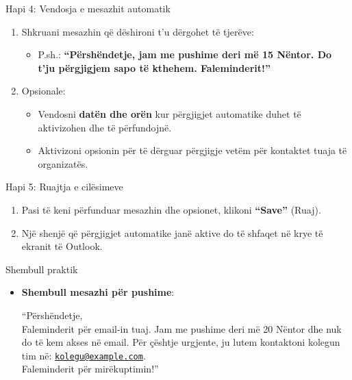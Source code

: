 \documentclass[
  ignorenonframetext,
]{beamer}
\providecommand{\tightlist}{%
  \setlength{\itemsep}{0pt}\setlength{\parskip}{0pt}}
\begin{document}
\begin{frame}{Hapi 4: Vendosja e mesazhit automatik}
\label{hapi-4-vendosja-e-mesazhit-automatik}
\begin{enumerate}
\item
  Shkruani mesazhin që dëshironi t'u dërgohet të tjerëve:

  \begin{itemize}
  \tightlist
  \item
    P.sh.: \textbf{``Përshëndetje, jam me pushime deri më 15 Nëntor. Do
    t'ju përgjigjem sapo të kthehem. Faleminderit!''}
  \end{itemize}
\item
  Opsionale:

  \begin{itemize}
  \item
    Vendosni \textbf{datën dhe orën} kur përgjigjet automatike duhet të
    aktivizohen dhe të përfundojnë.
  \item
    Aktivizoni opsionin për të dërguar përgjigje vetëm për kontaktet
    tuaja të organizatës.
  \end{itemize}
\end{enumerate}
\end{frame}

\begin{frame}{Hapi 5: Ruajtja e cilësimeve}
\label{hapi-5-ruajtja-e-ciluxebsimeve}
\begin{enumerate}
\item
  Pasi të keni përfunduar mesazhin dhe opsionet, klikoni
  \textbf{``Save''} (Ruaj).
\item
  Një shenjë që përgjigjet automatike janë aktive do të shfaqet në krye
  të ekranit të Outlook.
\end{enumerate}
\end{frame}

\begin{frame}{Shembull praktik}
\label{shembull-praktik-2}
\begin{itemize}
\item
  \textbf{Shembull mesazhi për pushime}:

  ``Përshëndetje,\\
  Faleminderit për email-in tuaj. Jam me pushime deri më 20 Nëntor dhe
  nuk do të kem akses në email. Për çështje urgjente, ju lutem
  kontaktoni kolegun tim në:
  \href{mailto:kolegu@example.com}{\nolinkurl{kolegu@example.com}}.\\
  Faleminderit për mirëkuptimin!''
\end{itemize}
\end{frame}
\end{document}
